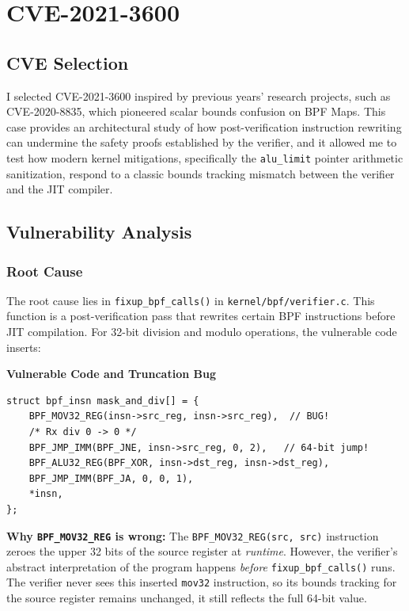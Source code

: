 \chapter{CVE-2021-3600}

\section{CVE Selection}
I selected CVE-2021-3600 inspired by previous years' research projects, such as CVE-2020-8835, which pioneered scalar bounds confusion on BPF Maps. This case provides an architectural study of how post-verification instruction rewriting can undermine the safety proofs established by the verifier, and it allowed me to test how modern kernel mitigations, specifically the \texttt{alu\_limit} pointer arithmetic sanitization, respond to a classic bounds tracking mismatch between the verifier and the JIT compiler.

\section{Vulnerability Analysis}

\subsection{Root Cause}

The root cause lies in \texttt{fixup\_bpf\_calls()} in \texttt{kernel/bpf/verifier.c}. This function is a post-verification pass that rewrites certain BPF instructions before JIT compilation. For 32-bit division and modulo operations, the vulnerable code inserts:

\textbf{Vulnerable Code and Truncation Bug}

\begin{lstlisting}[style=kernel,caption={Vulnerable fixup code (kernel/bpf/verifier.c, fixup\_bpf\_calls())}]
struct bpf_insn mask_and_div[] = {
    BPF_MOV32_REG(insn->src_reg, insn->src_reg),  // BUG!
    /* Rx div 0 -> 0 */
    BPF_JMP_IMM(BPF_JNE, insn->src_reg, 0, 2),   // 64-bit jump!
    BPF_ALU32_REG(BPF_XOR, insn->dst_reg, insn->dst_reg),
    BPF_JMP_IMM(BPF_JA, 0, 0, 1),
    *insn,
};
\end{lstlisting}

\textbf{Why \texttt{BPF\_MOV32\_REG} is wrong:}
The \texttt{BPF\_MOV32\_REG(src, src)} instruction zeroes the upper 32 bits of the source register at \emph{runtime}. However, the verifier's abstract interpretation of the program happens \emph{before} \texttt{fixup\_bpf\_calls()} runs. The verifier never sees this inserted \texttt{mov32} instruction, so its bounds tracking for the source register remains unchanged, it still reflects the full 64-bit value.

